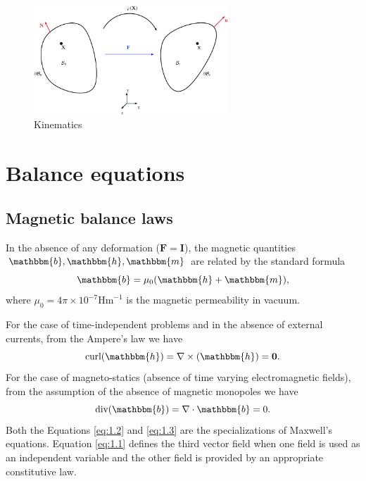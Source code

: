 \documentclass[11pt,a4paper,final]{article}
\begin{document}
\begin{figure}[h]
\centering 
\includegraphics[width=0.65\textwidth]{kinematics_potato.pdf}
\caption{Kinematics}
\label{fig:1.1}
\end{figure} 

\section{Balance equations}
\subsection{Magnetic balance laws}
In the absence of any deformation ($\mathbf{F} = \mathbf{I}$), the magnetic quantities $\mathbbm{b}, \mathbbm{h}, \mathbbm{m}$ are related by the standard formula
\begin{equation}
\mathbbm{b} = \mu_0 (\mathbbm{h} + \mathbbm{m}),
\label{eq:1.1}
\end{equation}
where $\mu_0 = 4\pi \times 10^{-7} \text{Hm}^{-1}$ is the magnetic permeability in vacuum. \par 
For the case of time-independent problems and in the absence of external currents, from the Ampere's law we have \cite{KANKANALA} 
\begin{equation}
\text{curl} (\mathbbm{h}) = \nabla \times (\mathbbm{h}) = \mathbf{0}.
\label{eq:1.2}
\end{equation}
For the case of magneto-statics (absence of time varying electromagnetic fields), from the assumption of the absence of magnetic monopoles we have \cite{KANKANALA}\begin{equation}
\text{div}(\mathbbm{b}) = \nabla \cdot \mathbbm{b} = 0.
\label{eq:1.3}
\end{equation}
Both the Equations \eqref{eq:1.2} and \eqref{eq:1.3} are the specializations of Maxwell's equations. Equation \eqref{eq:1.1} defines the third vector field when one field is used as an independent variable and the other field is provided by an appropriate constitutive law. 
\end{document}
